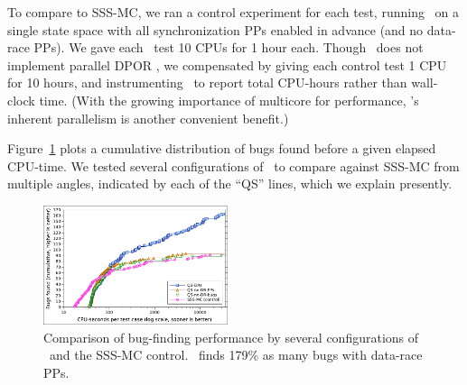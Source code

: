 To compare to SSS-MC, we ran a control experiment for each test, running \landslide~on a single state space with all synchronization PPs enabled in advance (and no data-race PPs).
We gave each \quicksand~test 10 CPUs for 1 hour each. %
Though \landslide~does not implement parallel DPOR \cite{parallel-dpor}, we compensated by giving each control test 1 CPU for 10 hours,
and instrumenting \quicksand~to report total CPU-hours rather than wall-clock time.
(With the growing importance of multicore for performance, \quicksand's inherent parallelism is another convenient benefit.)

Figure~\ref{fig:dowefindbugsfaster} plots a cumulative distribution of bugs found before a given elapsed CPU-time. %
We tested several configurations of \quicksand~to compare against SSS-MC from multiple angles,
indicated by each of the ``QS'' lines,
which we explain presently.

\begin{figure}[t]
	\includegraphics[width=0.48\textwidth]{dowefindbugsfaster-squashed.pdf}
	\caption{Comparison of bug-finding performance
	by several configurations of \quicksand~and the SSS-MC control.
	\quicksand~finds 179\% as many bugs with data-race PPs.}
	\label{fig:dowefindbugsfaster}
\end{figure}

